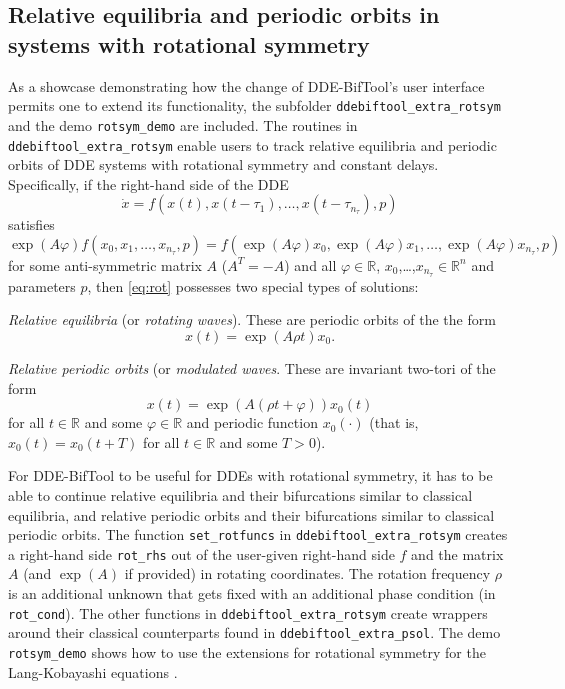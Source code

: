 \documentclass[11pt]{scrartcl}
\renewcommand{\phi}{\varphi}
\newcommand{\R}{\mathbb{R}}
\newcommand{\blist}[1]{\mbox{\lstinline!#1!}}
\begin{document}
\subsection{Relative equilibria and periodic orbits in systems with
  rotational symmetry}
\label{sec:rot}

As a showcase demonstrating how the change of DDE-BifTool's user
interface permits one to extend its functionality, the subfolder
\texttt{ddebiftool\_extra\_rotsym} and the demo \texttt{rotsym\_demo}
are included. The routines in \texttt{ddebiftool\_extra\_rotsym}
enable users to track relative equilibria and periodic orbits of DDE
systems with rotational symmetry and constant delays. Specifically, if
the right-hand side of the DDE
\begin{equation}\label{eq:rot}
  \dot x=f(x(t),x(t-\tau_1),\ldots,x(t-\tau_{n_\tau}),p)
\end{equation}
satisfies
\begin{displaymath}
  \exp(A\phi)f(x_0,x_1,\ldots,x_{n_\tau},p)=
  f(\exp(A\phi)x_0,\exp(A\phi)x_1,\ldots,
  \exp(A\phi)x_{n_\tau},p)
\end{displaymath}
for some anti-symmetric matrix $A$ ($A^T=-A$) and all $\phi\in\R$,
$x_0$,\ldots,$x_{n_\tau}\in\R^n$ and parameters $p$, then
\eqref{eq:rot} possesses two special types of solutions:
\begin{compactitem}
\item \emph{Relative equilibria} (or \emph{rotating waves}). These are
  periodic orbits of the the form
  \begin{equation}
    x(t)=\exp(A\rho t)x_0\mbox{.}\label{eq:rw}
\end{equation}
\item \emph{Relative periodic orbits} (or \emph{modulated
    waves}. These are invariant two-tori of the form
  \begin{equation}
    x(t)=\exp(A(\rho t+\phi))x_0(t)\label{eq:mw}
  \end{equation}
  for all $t\in\R$ and some $\phi\in\R$ and periodic function
  $x_0(\cdot)$ (that is, $x_0(t)=x_0(t+T)$ for all $t\in\R$ and some $T>0$).
\end{compactitem}
For DDE-BifTool to be useful for DDEs with rotational symmetry, it
has to be able to continue relative equilibria and their bifurcations
similar to classical equilibria, and relative periodic orbits and their
bifurcations similar to classical periodic orbits. The function
\blist{set_rotfuncs} in \texttt{ddebiftool\_extra\_rotsym} creates a
right-hand side \blist{rot_rhs} out of the user-given right-hand side
$f$ and the matrix $A$ (and $\exp(A)$ if provided) in rotating
coordinates. The rotation frequency $\rho$ is an additional unknown
that gets fixed with an additional phase condition (in
\blist{rot_cond}). The other functions in
\texttt{ddebiftool\_extra\_rotsym} create wrappers around their
classical counterparts found in \texttt{ddebiftool\_extra\_psol}. The
demo \texttt{rotsym\_demo} shows how to use the extensions for
rotational symmetry for the Lang-Kobayashi equations \cite{LK80}.
\end{document}
